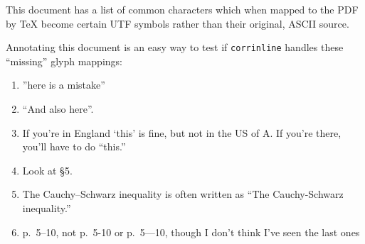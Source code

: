 \documentclass{amsart}
\begin{document}
This document has a list of common characters which when mapped to the PDF by \TeX{} become certain
UTF symbols rather than their original, ASCII source.

Annotating this document is an easy way to test if {\tt corrinline} handles these ``missing'' glyph %
mappings:

\begin{enumerate}[(1)]

\item ''here is %
a mistake''

\item ``And %
also here''.

\item If you're in England `this' is fine, but not in the US of A. If you're there, you'll have to do ``this.''

\item Look at \S 5.

\item The %
Cauchy--Schwarz inequality is often written as %
``The Cauchy-Schwarz inequality.'' %

\item %
p.~5--10, not p.~5-10 or %
p.~5---10, though I don't think I've seen the last ones


\end{enumerate}
\end{document}
